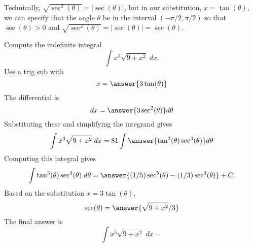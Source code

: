 \documentclass{ximera}
\begin{document}
\begin{remark}
Technically, $\sqrt{\sec^2(\theta)} = |\sec(\theta)|$, but in our substitution, $x = \tan(\theta)$,
we can specify that the angle $\theta$ be in the interval $(-\pi/2, \pi/2)$ so that 
$\sec(\theta) > 0$ and $\sqrt{\sec^2(\theta)} = |\sec(\theta)| = \sec(\theta)$.
\end{remark}




\begin{problem}
Compute the indefinite integral
\[
\int   x^3\sqrt{9 + x^2}\; dx.
\]
Use a trig sub with\\
\[
x = \answer{3\tan(\theta)}
\]
The differential is\\
\[
dx = \answer{3\sec^2(\theta)}d\theta
\]
Substituting these and simplifying the integrand gives\\
\[
\int   x^3\sqrt{9 + x^2}\; dx = 81\int \answer{\tan^3(\theta)\sec^3(\theta)} d\theta
\]
Computing this integral gives
\[
\int \tan^3(\theta)\sec^3(\theta) \; d\theta = \answer{(1/5)\sec^5(\theta) - (1/3)\sec^3(\theta)} + C.
\]
Based on the substitution $x = 3\tan(\theta)$, \\
\[
\sec(\theta) = \answer{\sqrt{9+x^2}/3}
\]
The final answer is
\[
\int   x^3\sqrt{9 + x^2}\; dx = 
\]
\begin{center}
\begin{multipleChoice}
\end{multipleChoice}
\end{center}
\end{problem}
\end{document}
